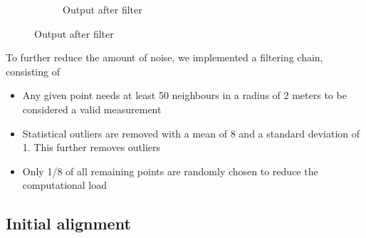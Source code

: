 \documentclass[10pt,twocolumn,letterpaper]{article}
\begin{document}
\begin{figure}
\begin{subfigure}{.5\linewidth}
  \caption{Output after filter}
  \label{fig:sfig2}
\end{subfigure}

\end{figure}


To further reduce the amount of noise, we implemented a filtering chain, consisting of 

\begin{itemize}
   \item Any given point needs at least 50 neighbours in a radius of 2 meters to be considered a valid measurement
   \item Statistical outliers are removed with a mean of 8 and a standard deviation of 1. This further removes outliers
   \item Only 1/8 of all remaining points are randomly chosen to reduce the computational load
\end{itemize}

\subsection{Initial alignment}
\end{document}
